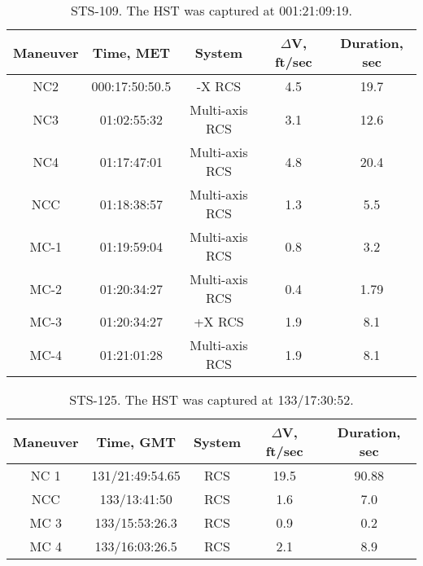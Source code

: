 \documentclass[onecolumn,10pt]{jhwhw}
\begin{document}
\begin{table}[h]
\begin{center}
\begin{tabular}{|c |c |c |c |c|}
\hline
Maneuver & Time, MET & System & $\Delta$V, ft/sec & Duration, sec \\
\hline
NC2  & 000:17:50:50.5 & -X RCS & 4.5 & 19.7 \\ \hline
NC3  & 01:02:55:32    & Multi-axis RCS & 3.1 & 12.6 \\ \hline
NC4  & 01:17:47:01    & Multi-axis RCS & 4.8 & 20.4 \\ \hline
NCC  & 01:18:38:57    & Multi-axis RCS & 1.3 & 5.5 \\ \hline
MC-1 & 01:19:59:04    & Multi-axis RCS & 0.8 & 3.2 \\ \hline
MC-2 & 01:20:34:27    & Multi-axis RCS & 0.4 & 1.79 \\ \hline
MC-3 & 01:20:34:27    & +X RCS & 1.9 & 8.1 \\ \hline
MC-4 & 01:21:01:28    & Multi-axis RCS & 1.9 & 8.1 \\ \hline
\end{tabular}
\end{center}
\caption{STS-109. The HST was captured at 001:21:09:19.}
\end{table}


\begin{table}[h]
\begin{center}
\begin{tabular}{|c |c |c |c |c|}
\hline
Maneuver & Time, GMT & System & $\Delta$V, ft/sec & Duration, sec \\
\hline
NC 1 & 131/21:49:54.65 & RCS & 19.5 & 90.88   \\ \hline
NCC  & 133/13:41:50    & RCS &  1.6 & 7.0     \\ \hline
MC 3 & 133/15:53:26.3  & RCS &  0.9 & 0.2     \\ \hline
MC 4 & 133/16:03:26.5  & RCS &  2.1 & 8.9     \\ \hline
\end{tabular}
\end{center}
\caption{STS-125. The HST was captured at 133/17:30:52.}
\end{table}
\end{document}
